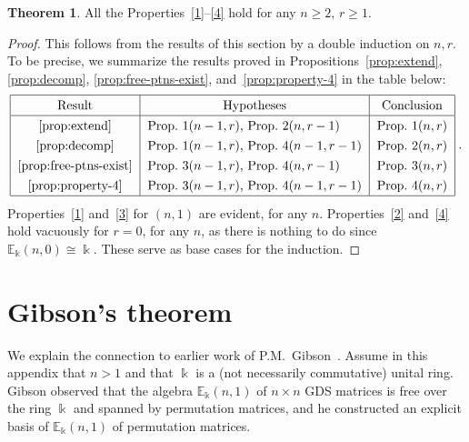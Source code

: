 \documentclass[10pt]{article}
\theoremstyle{definition}
\newtheorem{theo}[theorem]{Theorem}
\newcommand{\E}{\mathbb{E}}
\begin{document}
\begin{theo}\label{thm:properties}
 All the Properties~\ref{1}--\ref{4} hold for any $n \ge 2$, $r\ge
 1$.
\end{theo}

\begin{proof}
This follows from the results of this section by a double induction on
$n,r$. To be precise, we summarize the results proved in Propositions~\ref{prop:extend}, \ref{prop:decomp}, \ref{prop:free-ptns-exist}, and~\ref{prop:property-4} in the table below:
\[
\renewcommand{\arraystretch}{1.3}
\begin{tabular}{|c|l|c|}
\hline
 Result & \multicolumn{1}{c|}{Hypotheses} & Conclusion \\ \hline
\ref{prop:extend}& Prop.~1$(n-1,r)$, Prop.~2$(n,r-1)$ & Prop.~1$(n,r)$ \\
\ref{prop:decomp}& Prop.~1$(n-1,r)$, Prop.~4$(n-1,r-1)$ & Prop.~2$(n,r)$ \\
\ref{prop:free-ptns-exist}& Prop.~3$(n-1,r)$, Prop.~4$(n,r-1)$ & Prop.~3$(n,r)$ \\
\ref{prop:property-4}& Prop.~3$(n-1,r)$, Prop.~4$(n-1,r-1)$ & Prop.~4$(n,r)$\\ \hline
\end{tabular}\; .
\]
Properties~\ref{1} and~\ref{3} for $(n,1)$ are evident, for any
$n$. Properties~\ref{2} and~\ref{4} hold vacuously for $r=0$, for any
$n$, as there is nothing to do since $\E_\Bbbk(n,0) \cong
\Bbbk$. These serve as base cases for the induction.
\end{proof}





\appendix
\section{Gibson's theorem}\label{sec:Gibson}%
We explain the connection to earlier work of P.M.~Gibson~\cite{Gibson}. Assume in this appendix that $n > 1$ and that $\Bbbk$
is a (not necessarily commutative) unital ring. Gibson observed that
the algebra $\E_\Bbbk(n,1)$ of $n \times n$ GDS matrices is free over
the ring $\Bbbk$ and spanned by permutation matrices, and he
constructed an explicit basis of $\E_\Bbbk(n,1)$ of permutation
matrices.
\end{document}
